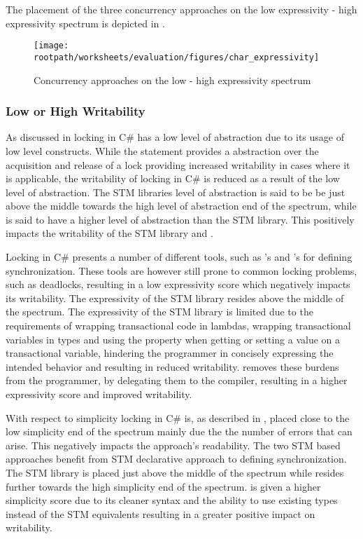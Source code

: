 The placement of the three concurrency approaches on the low expressivity - high expressivity spectrum is depicted in . 

\begin{figure}[htbp]
\centering
 \texttt{[image: \\rootpath/worksheets/evaluation/figures/char\_expressivity]} 
 \caption{Concurrency approaches on the low - high expressivity spectrum}
\label{fig:char_expressivity}
\end{figure}

\subsubsection{Low or High Writability}
As discussed in  locking in C\# has a low level of abstraction due to its usage of low level constructs. While the  statement provides a abstraction over the acquisition and release of a lock providing increased writability in cases where it is applicable, the writability of locking in C\# is reduced as a result of the low level of abstraction. The \ac{STM} libraries level of abstraction is said to be be just above the middle towards the high level of abstraction end of the spectrum, while \stmname is said to have a higher level of abstraction than the \ac{STM} library. This positively impacts the writability of the \ac{STM} library and \stmname.

Locking in C\# presents a number of different tools, such as 's and 's for defining synchronization. These tools are however still prone to common locking problems, such as deadlocks, resulting in a low expressivity score which negatively impacts its writability. The expressivity of the \ac{STM} library resides above the middle of the spectrum. The expressivity of the \ac{STM} library is limited due to the requirements of wrapping transactional code in lambdas, wrapping transactional variables in  types and using the  property when getting or setting a value on a transactional variable, hindering the programmer in concisely expressing  the intended behavior and resulting in reduced writability. \stmname removes these burdens from the programmer, by delegating them to the compiler, resulting in a higher expressivity score and improved writability.

With respect to simplicity locking in C\# is, as described in , placed close to the low simplicity end of the spectrum mainly due the the number of errors that can arise. This negatively impacts the approach's readability. The two \ac{STM} based approaches benefit from \ac{STM} declarative approach to defining synchronization. The \ac{STM} library is placed just above the middle of the spectrum while \stmname resides further towards the high simplicity end of the spectrum. \stmname is given a higher simplicity score due to its cleaner syntax and the ability to use existing types instead of the \ac{STM} equivalents resulting in a greater positive impact on writability.

